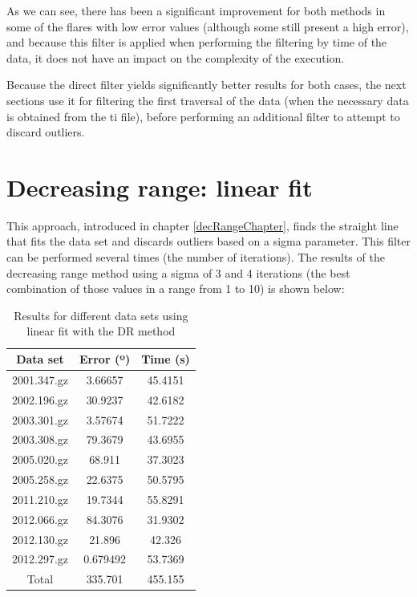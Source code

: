 As we can see, there has been a significant improvement for both methods in some of the flares with low error values (although some still present a high error), and because this filter is applied when performing the filtering by time of the data, it does not have an impact on the complexity of the execution. 

Because the direct filter yields significantly better results for both cases, the next sections use it for filtering the first traversal of the data (when the necessary data is obtained from the ti file), before performing an additional filter to attempt to discard outliers.

\clearpage

\section{Decreasing range: linear fit}

This approach, introduced in chapter \ref{decRangeChapter}, finds the straight line that fits the data set and discards outliers based on a sigma parameter. This filter can be performed several times (the number of iterations). The results of the decreasing range method using a sigma of 3 and 4 iterations (the best combination of those values in a range from 1 to 10) is shown below:

\begin{table}[h!]
	\centering
	\def\arraystretch{1.2}
	\begin{tabular}{|c c c|} 
		\hline
		Data set & Error (º) & Time (s) \\ [0.5ex] 
		\hline\hline
		2001.347.gz & 3.66657 & 45.4151 \\
		\hline
		2002.196.gz & 30.9237 & 42.6182 \\
		\hline
		2003.301.gz & 3.57674 & 51.7222 \\
		\hline
		2003.308.gz & 79.3679 & 43.6955 \\
		\hline
		2005.020.gz & 68.911 & 37.3023 \\
		\hline
		2005.258.gz & 22.6375 & 50.5795 \\
		\hline
		2011.210.gz & 19.7344 & 55.8291 \\
		\hline
		2012.066.gz & 84.3076 & 31.9302 \\
		\hline
		2012.130.gz & 21.896 & 42.326 \\
		\hline
		2012.297.gz & 0.679492 & 53.7369 \\
		\hline
		Total & 335.701 & 455.155 \\
		\hline
	\end{tabular}
	\caption{Results for different data sets using linear fit with the DR method}
\end{table}

